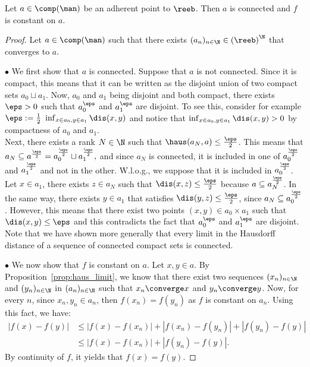 \begin{proposition}\label{prop:reeb_adherence} Let $a\in\comp(\man)$ be an adherent point to $\reeb$. Then $a$ is connected and $f$ is constant on $a$.

\end{proposition}
\begin{proof}
Let $a\in\comp(\man)$ such that there exists $(a_n)_{n\in\N}\in\left(\reeb\right)^{\N}$ that converges to $a$.

$\bullet$ We first show that $a$ is connected. 
    Suppose that $a$ is not connected. Since it is compact, this means that it can be written as the disjoint union of two compact sets $a_0\sqcup a_1$.  Now, $a_0$ and $a_1$ being disjoint and both compact, there exists $\eps>0$ such that $a_0^\eps$ and $a_1^\eps$ are disjoint. To see this, consider for example $\eps :=\frac{1}{2}\ \inf_{x\in a_0,y\in a_1}\dis(x,y)$  and notice that $\inf_{x\in a_0,y\in a_1}\dis(x,y)>0$ by compactness of $a_0$ and $a_1$. \\
    Next, there exists a rank $N\in\N$ such that $\haus(a_N,a)\leq\frac{\eps}{2}$. This means that 
     $a_N\subseteq a^{\frac{\eps}{2}}=a_0^{\frac{\eps}{2}}\sqcup a_1^{\frac{\eps}{2}},$ 
    and since $a_N$ is connected, it is included in one of $a_0^{\frac{\eps}{2}}$ and $a_1^{\frac{\eps}{2}}$ and not in the other. W.l.o.g.,
    we suppose that it is included in $a_0^{\frac{\eps}{2}}$. 
    Let $x\in a_1$, there exists $z\in a_N$ such that $\dis(x,z)\leq\frac{\eps}{2}$ because $a\subseteq a_N^{\frac{\eps}{2}}$. 
    In the same way, there exists $y\in a_1$ that satisfies $\dis(y,z)\leq\frac{\eps}{2}$, since $a_N\subseteq a_0^{\frac{\eps}{2}}$. 
    However, this means that there exist two points $(x,y)\in a_0\times a_1$ such that $\dis(x,y)\leq \eps$ and this contradicts the fact that $a_0^\eps$ and $a_1^\eps$ are disjoint. Note that we have shown more generally that every limit in the Hausdorff distance  of a sequence of connected compact sets is connected.
    
    
    
$\bullet$ We now show that $f$ is constant on $a$. 
    Let $x,y\in a$. By Proposition~\ref{prop:haus_limit}, we know that there exist two sequences $(x_n)_{n\in\N}$ and $(y_n)_{n\in\N}$ in $(a_n)_{n\in\N}$ such that $x_n\converge x$ and $y_n\converge y$. 
    Now, for every $n$, since  $x_n,y_n\in a_n$, then $f(x_n)=f(y_n)$ as $f$ is constant on $a_n$. Using this fact, we have:
    \begin{align*}
        | f(x)-f(y) |&\leq | f(x)-f(x_n) | + | f(x_n)-f(y_n) |+ | f(y_n)-f(y) |\\
        &\leq | f(x)-f(x_n) | + | f(y_n)-f(y) |.
    \end{align*}
    By continuity of $f$, it yields that $f(x)=f(y)$.
 

\end{proof}

